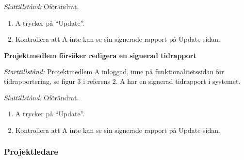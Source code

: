 \documentclass[a4paper]{article}
\begin{document}
\begin{FT}
\emph{Sluttillstånd:} Oförändrat.

\begin{enumerate}
\item A trycker på ``Update''.
\item Kontrollera att A inte kan se sin signerade rapport på Update sidan.
\end{enumerate}

\item
\textbf{Projektmedlem försöker redigera en signerad tidrapport}

\emph{Starttillstånd:} Projektmedlem A inloggad, inne på funktionalitetssidan för tidrapportering, se figur 3 i referens 2. A har en signerad tidrapport i systemet.

\emph{Sluttillstånd:} Oförändrat.

\begin{enumerate}
\item A trycker på ``Update''.
\item Kontrollera att A inte kan se sin signerade rapport på Update sidan.
\end{enumerate}

\end{FT}


\subsubsection{Projektledare}
\end{document}
